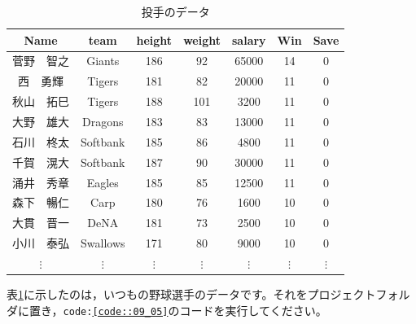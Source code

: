 \documentclass{ltjsbook}
\begin{document}
\begin{table}
    \caption{投手のデータ}
    \centering
    \begin{tabular}[t]{ccccccc}
    \hline
    Name & team & height & weight & salary & Win & Save\\
    \hline
    菅野　智之 & Giants & 186 & 92 & 65000 & 14 & 0\\
    西　勇輝 & Tigers & 181 & 82 & 20000 & 11 & 0\\
    秋山　拓巳 & Tigers & 188 & 101 & 3200 & 11 & 0\\
    大野　雄大 & Dragons & 183 & 83 & 13000 & 11 & 0\\
    石川　柊太 & Softbank & 185 & 86 & 4800 & 11 & 0\\
    千賀　滉大 & Softbank & 187 & 90 & 30000 & 11 & 0\\
    涌井　秀章 & Eagles & 185 & 85 & 12500 & 11 & 0\\
    森下　暢仁 & Carp & 180 & 76 & 1600 & 10 & 0\\
    大貫　晋一 & DeNA & 181 & 73 & 2500 & 10 & 0\\
    小川　泰弘 & Swallows & 171 & 80 & 9000 & 10 & 0\\
     $\vdots$ & $\vdots$ & $\vdots$  & $\vdots$  & $\vdots$  & $\vdots$  & $\vdots$ \\
    \hline
    \end{tabular}
    \label{tbl::09_01}
    \end{table}

表\ref{tbl::09_01}に示したのは，いつもの野球選手のデータです。それをプロジェクトフォルダに置き，\texttt{code:\ref{code::09_05}}のコードを実行してください。
\end{document}
